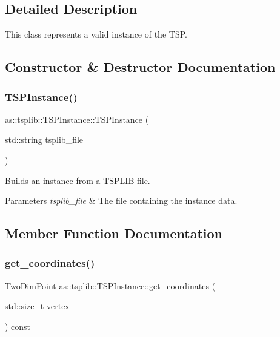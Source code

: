 \subsection{Detailed Description}
This class represents a valid instance of the T\+SP. 

\subsection{Constructor \& Destructor Documentation}
\mbox{\label{classas_1_1tsplib_1_1TSPInstance_a5cc9de2e917ae7aa608e10b4375155d6}} 
\subsubsection{\texorpdfstring{T\+S\+P\+Instance()}{TSPInstance()}}
{\footnotesize\ttfamily as\+::tsplib\+::\+T\+S\+P\+Instance\+::\+T\+S\+P\+Instance (\begin{DoxyParamCaption}\item[{std\+::string}]{tsplib\+\_\+file }\end{DoxyParamCaption})\hspace{0.3cm}{\ttfamily [inline]}}



Builds an instance from a T\+S\+P\+L\+IB file. 


\begin{DoxyParams}{Parameters}
{\em tsplib\+\_\+file} & The file containing the instance data. \\
\hline
\end{DoxyParams}


\subsection{Member Function Documentation}
\mbox{\label{classas_1_1tsplib_1_1TSPInstance_a36962fb85e309faa3efb28fae3b2956b}} 
\subsubsection{\texorpdfstring{get\+\_\+coordinates()}{get\_coordinates()}}
{\footnotesize\ttfamily \hyperlink{structas_1_1TwoDimPoint}{Two\+Dim\+Point} as\+::tsplib\+::\+T\+S\+P\+Instance\+::get\+\_\+coordinates (\begin{DoxyParamCaption}\item[{std\+::size\+\_\+t}]{vertex }\end{DoxyParamCaption}) const\hspace{0.3cm}{\ttfamily [inline]}}



